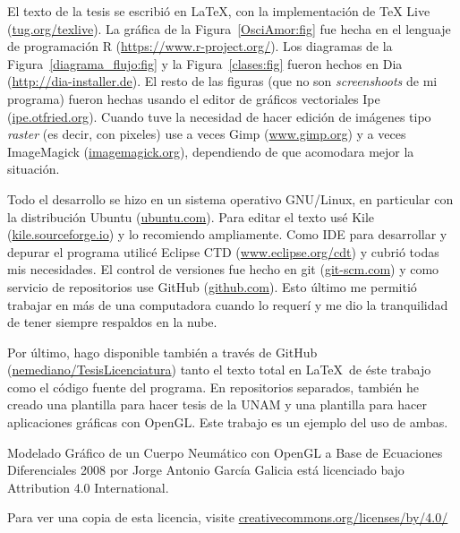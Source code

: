 El texto de la tesis se escribió en \LaTeX, con la implementación de TeX Live (\href{https://tug.org/texlive/}{tug.org/texlive}).
La gráfica de la Figura~\ref{OsciAmor:fig} fue hecha en el lenguaje de programación R (\href{https://www.r-project.org/}{https://www.r-project.org/}).
Los diagramas de la Figura~\ref{diagrama_flujo:fig} y la Figura~\ref{clases:fig} fueron hechos en Dia (\href{http://dia-installer.de/index.html.en}{http://dia-installer.de}).
El resto de las figuras (que no son \emph{\textenglish{screenshoots}} de mi programa) fueron hechas usando el editor de gráficos vectoriales Ipe (\href{https://ipe.otfried.org/}{ipe.otfried.org}).
Cuando tuve la necesidad de hacer edición de imágenes tipo \emph{\textenglish{raster}} (es decir, con pixeles) use a veces Gimp (\href{https://www.gimp.org/}{www.gimp.org}) y a veces ImageMagick (\href{https://imagemagick.org/index.php}{imagemagick.org}), dependiendo de que acomodara mejor la situación.

Todo el desarrollo se hizo en un sistema operativo GNU/Linux, en particular con la distribución Ubuntu (\href{https://ubuntu.com/}{ubuntu.com}).
Para editar el texto usé Kile (\href{https://kile.sourceforge.io/}{kile.sourceforge.io}) y lo recomiendo ampliamente.
Como IDE para desarrollar y depurar el programa utilicé Eclipse CTD (\href{https://www.eclipse.org/cdt/}{www.eclipse.org/cdt}) y cubrió todas mis necesidades.
El control de versiones fue hecho en git (\href{https://git-scm.com/}{git-scm.com}) y como servicio de repositorios use GitHub (\href{https://github.com/}{github.com}).
Esto último me permitió trabajar en más de una computadora cuando lo requerí y me dio la tranquilidad de tener siempre respaldos en la nube.

Por último, hago disponible también a través de GitHub (\href{https://github.com/nemediano/TesisLicenciatura}{nemediano/TesisLicenciatura}) tanto el texto total en \LaTeX~de éste trabajo como el código fuente del programa.
En repositorios separados, también he creado una plantilla para hacer tesis de la UNAM y una plantilla para hacer aplicaciones gráficas con OpenGL.
Este trabajo es un ejemplo del uso de ambas.

Modelado Gráfico de un Cuerpo Neumático con OpenGL a Base de Ecuaciones Diferenciales \textcopyright{} 2008 por Jorge Antonio García Galicia está licenciado bajo Attribution 4.0 International.

Para ver una copia de esta licencia, visite \href{http://creativecommons.org/licenses/by/4.0/}{creativecommons.org/licenses/by/4.0/}
